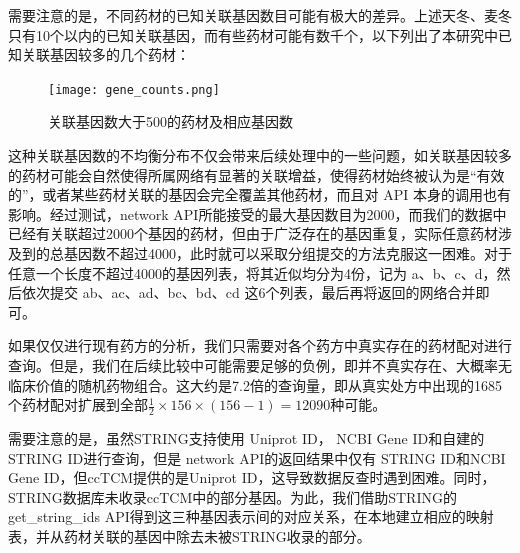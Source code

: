 需要注意的是，不同药材的已知关联基因数目可能有极大的差异。上述天冬、麦冬只有10个以内的已知关联基因，而有些药材可能有数千个，以下列出了本研究中已知关联基因较多的几个药材：

\begin{figure}[H]
  \centering
  \texttt{[image: gene\_counts.png]}
  \caption{关联基因数大于500的药材及相应基因数}
  \label{fig:top_genes}
\end{figure}

这种关联基因数的不均衡分布不仅会带来后续处理中的一些问题，如关联基因较多的药材可能会自然使得所属网络有显著的关联增益，使得药材始终被认为是“有效的”，或者某些药材关联的基因会完全覆盖其他药材，而且对 API 本身的调用也有影响。经过测试，{network} API所能接受的最大基因数目为2000，而我们的数据中已经有关联超过2000个基因的药材，但由于广泛存在的基因重复，实际任意药材涉及到的总基因数不超过4000，此时就可以采取分组提交的方法克服这一困难。对于任意一个长度不超过4000的基因列表，将其近似均分为4份，记为 a、b、c、d，然后依次提交 ab、ac、ad、bc、bd、cd 这6个列表，最后再将返回的网络合并即可。

如果仅仅进行现有药方的分析，我们只需要对各个药方中真实存在的药材配对进行查询。但是，我们在后续比较中可能需要足够的负例，即并不真实存在、大概率无临床价值的随机药物组合。这大约是7.2倍的查询量，即从真实处方中出现的1685个药材配对扩展到全部$\frac{1}{2} \times 156 \times (156 - 1) = 12090$种可能。

需要注意的是，虽然STRING支持使用 Uniprot ID， NCBI Gene ID和自建的STRING ID进行查询，但是 {network} API的返回结果中仅有 STRING ID和NCBI Gene ID，但ccTCM提供的是Uniprot ID，这导致数据反查时遇到困难。同时，STRING数据库未收录ccTCM中的部分基因。为此，我们借助STRING的 {get\_string\_ids} API得到这三种基因表示间的对应关系，在本地建立相应的映射表，并从药材关联的基因中除去未被STRING收录的部分。